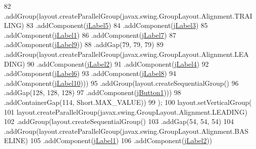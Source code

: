 \begin{DoxyCode}
82                         .addGroup(layout.createParallelGroup(javax.swing.GroupLayout.Alignment.TRAILING)
83                             .addComponent(\mbox{\hyperlink{class_interfaz_package_1_1_consulta_lector_aae29076b214d7968c66c12c3cb9dcab2}{jLabel5}})
84                             .addComponent(\mbox{\hyperlink{class_interfaz_package_1_1_consulta_lector_a105b198c795b5ad60698132d959db7c1}{jLabel3}})
85                             .addComponent(\mbox{\hyperlink{class_interfaz_package_1_1_consulta_lector_a902ef6727581a080bfe5c84883c7f39e}{jLabel1}})
86                             .addComponent(\mbox{\hyperlink{class_interfaz_package_1_1_consulta_lector_a0811e604bafe32c5d692a79c0f604233}{jLabel7}})
87                             .addComponent(\mbox{\hyperlink{class_interfaz_package_1_1_consulta_lector_a96866944f1cce16d0348b78422bbb375}{jLabel9}}))
88                         .addGap(79, 79, 79)
89                         .addGroup(layout.createParallelGroup(javax.swing.GroupLayout.Alignment.LEADING)
90                             .addComponent(\mbox{\hyperlink{class_interfaz_package_1_1_consulta_lector_abd8a9863dc8780ef20182d8e6de1f544}{jLabel2}})
91                             .addComponent(\mbox{\hyperlink{class_interfaz_package_1_1_consulta_lector_a17804aaae39ab2791472fa0422b576ff}{jLabel4}})
92                             .addComponent(\mbox{\hyperlink{class_interfaz_package_1_1_consulta_lector_a1ae0bbc522d743dbe6a5df3d341f7b3b}{jLabel6}})
93                             .addComponent(\mbox{\hyperlink{class_interfaz_package_1_1_consulta_lector_a588cac9adcc7b646bf632082a010dde4}{jLabel8}})
94                             .addComponent(\mbox{\hyperlink{class_interfaz_package_1_1_consulta_lector_a4325d1c8a4fb7c899a653eaf0380ccad}{jLabel10}})))
95                     .addGroup(layout.createSequentialGroup()
96                         .addGap(128, 128, 128)
97                         .addComponent(\mbox{\hyperlink{class_interfaz_package_1_1_consulta_lector_a89e1d76ca4c265da8a91df4b4a2a030d}{jButton1}})))
98                 .addContainerGap(114, Short.MAX\_VALUE))
99         );
100         layout.setVerticalGroup(
101             layout.createParallelGroup(javax.swing.GroupLayout.Alignment.LEADING)
102             .addGroup(layout.createSequentialGroup()
103                 .addGap(54, 54, 54)
104                 .addGroup(layout.createParallelGroup(javax.swing.GroupLayout.Alignment.BASELINE)
105                     .addComponent(\mbox{\hyperlink{class_interfaz_package_1_1_consulta_lector_a902ef6727581a080bfe5c84883c7f39e}{jLabel1}})
106                     .addComponent(\mbox{\hyperlink{class_interfaz_package_1_1_consulta_lector_abd8a9863dc8780ef20182d8e6de1f544}{jLabel2}}))

\end{DoxyCode}

